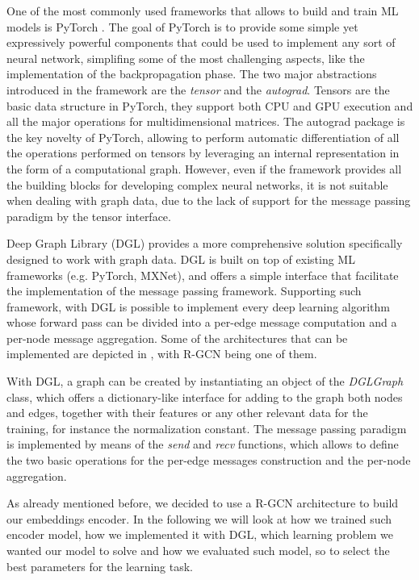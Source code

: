 \documentclass[%
    corpo=13.5pt,
    twoside,
    oldstyle,
    tipotesi=magistrale,
    greek,
    evenboxes
]{toptesi}
\begin{document}
One of the most commonly used frameworks that allows to build and train
ML models is PyTorch \cite{paszke2017}. The goal of PyTorch is to provide
some simple yet expressively powerful components that could be used to implement
any sort of neural network, simplifing some of the most challenging aspects,
like the implementation of the backpropagation phase.
The two major abstractions introduced in the framework are the \emph{tensor}
and the \emph{autograd}.
Tensors are the basic data structure in PyTorch, they support both CPU and GPU
execution and all the major operations for multidimensional matrices.
The autograd package is the key novelty of PyTorch, allowing to perform
automatic differentiation of all the operations performed on tensors by
leveraging an internal representation in the form of a computational graph.
However, even if the framework provides all the building blocks for
developing complex neural networks, it is not suitable when dealing with graph
data, due to the lack of support for the message passing paradigm by the
tensor interface.

Deep Graph Library \cite{wang2019} (DGL) provides a more comprehensive
solution specifically designed to work with graph data. DGL is built on top of
existing ML frameworks (e.g. PyTorch, MXNet), and offers a simple
interface that facilitate the implementation of the message passing framework.
Supporting such framework, with DGL is possible to implement every deep learning
algorithm whose forward pass can be divided into a per-edge message computation
and a per-node message aggregation.
Some of the architectures that can be implemented
are depicted in \cite{gilmer2017}, with R-GCN being one of them.

With DGL, a graph can be created by instantiating an object of the
\emph{DGLGraph} class, which offers a dictionary-like interface for adding to
the graph both nodes and edges, together with their features or any other
relevant data for the training, for instance the normalization constant.
The message passing paradigm is implemented by means of the \emph{send} and
\emph{recv} functions, which allows to define the two basic operations for the
per-edge messages construction and the per-node aggregation.

As already mentioned before, we decided to use a R-GCN architecture to build
our embeddings encoder.
In the following we will look at how we trained such encoder model, how we
implemented it with DGL, which learning problem we wanted our model to solve
and how we evaluated such model, so to select the best parameters for the
learning task.
\newline
\end{document}
